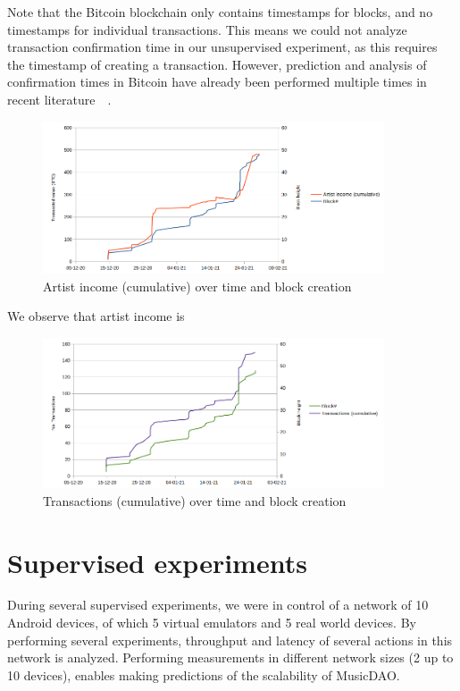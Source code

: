 Note that the Bitcoin blockchain only contains timestamps for blocks, and no timestamps for individual transactions. This means we could not analyze transaction confirmation time in our unsupervised experiment, as this requires the timestamp of creating a transaction. However, prediction and analysis of confirmation times in Bitcoin have already been performed multiple times in recent literature~\citep{kawase2017transaction}~\citep{koops2018predicting}.
\begin{figure}
    \centering
    \includegraphics[width=0.9\textwidth]{evaluation/artist-income.png}
    \caption{Artist income (cumulative) over time and block creation}
    \label{fig:artist-income}
\end{figure}
We observe that artist income is 

\begin{figure}
    \centering
    \includegraphics[width=0.9\textwidth]{evaluation/transactions.png}
    \caption{Transactions (cumulative) over time and block creation}
    \label{fig:transactions}
\end{figure}

\section{Supervised experiments}
During several supervised experiments, we were in control of a network of 10 Android devices, of which 5 virtual emulators and 5 real world devices. By performing several experiments, throughput and latency of several actions in this network is analyzed. Performing measurements in different network sizes (2 up to 10 devices), enables making predictions of the scalability of MusicDAO.

